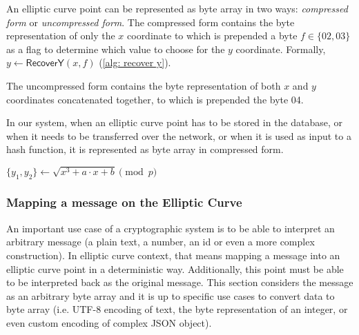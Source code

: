 An elliptic curve point can be represented as byte array in two ways: \textit{compressed form} or \textit{uncompressed form}. The compressed form contains the byte representation of only the $x$ coordinate to which is prepended a byte $f \in \{ 02, 03 \}$ as a flag to determine which value to choose for the $y$ coordinate. Formally, $y \gets \mathsf{RecoverY}(x, f)$ (\cref{alg: recover y}).

The uncompressed form contains the byte representation of both $x$ and $y$ coordinates concatenated together, to which is prepended the byte 04.

In our system, when an elliptic curve point has to be stored in the database, or when it needs to be transferred over the network, or when it is used as input to a hash function, it is represented as byte array in compressed form.

\begin{algorithm}[ht]
\DontPrintSemicolon
    \caption{$\mathsf{RecoverY} (x, f)$}
    \label{alg: recover y}
    $\{ y_1, y_2 \} \gets \sqrt{x^3 + a \cdot x + b} \pmod p$ \;
     
\end{algorithm}


\subsubsection{Mapping a message on the Elliptic Curve} \label{app: mapping a message on the elliptic curve}
An important use case of a cryptographic system is to be able to interpret an arbitrary message (a plain text, a number, an id or even a more complex construction). In elliptic curve context, that means mapping a message into an elliptic curve point in a deterministic way. Additionally, this point must be able to be interpreted back as the original message. This section considers the message as an arbitrary byte array and it is up to specific use cases to convert data to byte array (i.e. UTF-8 encoding of text, the byte representation of an integer, or even custom encoding of complex JSON object).

